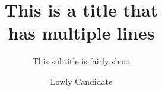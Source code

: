 \documentclass[chap,comply,bibliography=totoc]{uc-dissertation}
\title{This is a title that \\ has multiple lines}
\subtitle{This subtitle is fairly short}
\author{Lowly Candidate}
\theoremstyle{definition}
\numberwithin{equation}{section}
\begin{document}
 



\frontmatter

\maketitle

\abstractpage

\copyrightpage


\acknowledgmentspage

\tableofcontents 

\listoftables

\listoffigures

\end{document}
